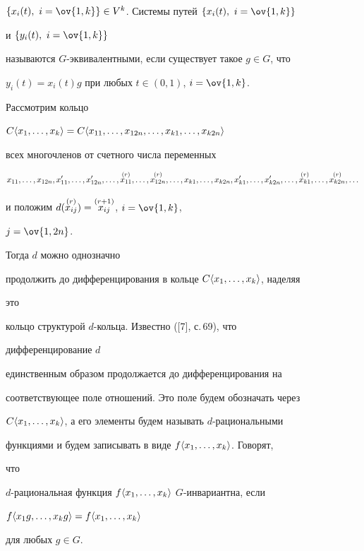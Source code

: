 $\{x_i(t), \ i=\ov{1,k}\}\in V^k$. Системы путей $\{x_i(t), \ i=\ov{1,k}\}$


и $\{y_i(t), \ i=\ov{1,k}\}$


называются $G$-эквивалентными, если существует такое $g\in G$, что 


$y_i(t)=x_i(t)g$ при любых $t\in(0,1)$, $i=\ov{1,k}$.





Рассмотрим кольцо


$C\la x_1,\dotsc,x_k\ra=C\la x_{11},\dotsc, x_{12n},\dotsc, 


x_{k1},\dotsc, x_{k2n}\ra$


всех многочленов от счетного числа переменных


$$


x_{11},\dotsc, x_{12n},x'_{11},\dotsc, x'_{12n},\dotsc,


\up{(r)}{x_{11}},\dotsc, \up{(r)}{x_{12n}},\dotsc,


x_{k1},\dotsc, x_{k2n},x'_{k1},\dotsc, x'_{k2n},\dotsc,


\up{(r)}{x_{k1}},\dotsc, \up{(r)}{x_{k2n}},\dotsc


$$


и положим $d(\overset{(r)}{x_{i j}}{})=\overset{(r+1)}{x_{i j}}{}$, $i=\ov{1,k}$, 


$j=\ov{1,2n}$.


Тогда $d$ можно однозначно


продолжить до дифференцирования в кольце $C\langle x_1,\dotsc,x_k\rangle$, наделяя 


это


кольцо структурой $d$-кольца. Известно ([7], с.\,69), что 


дифференцирование $d$


единственным образом продолжается до дифференцирования на 


соответствующее поле отношений. Это поле будем обозначать через 


$C\langle x_1,\dotsc,x_k\rangle$, а его элементы будем называть $d$-рациональными


функциями и будем записывать в виде $f\langle x_1,\dotsc,x_k\rangle$. Говорят, 


что 


$d$-рациональная функция $f\langle x_1,\dotsc,x_k\rangle$\; $G$-инвариантна, если 


$f\langle x_1g,\dotsc,x_k g\rangle=f\langle x_1,\dotsc,x_k\rangle$


для любых $g\in G$.





